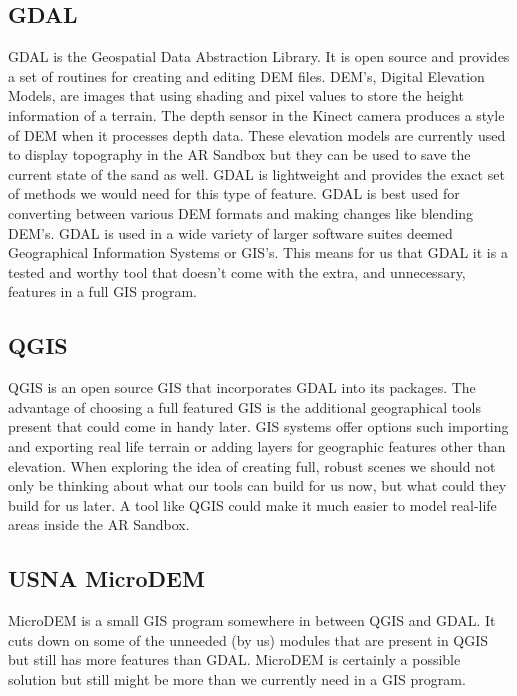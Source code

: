 \documentclass[letterpaper, 10pt, onecolumn, draftclsnofoot]{IEEEtran}
\begin{document}
    \subsection{GDAL}
    GDAL is the Geospatial Data Abstraction Library. It is open source and provides a set of routines for creating and editing DEM files. DEM’s, Digital Elevation Models, are images that using shading and pixel values to store the height information of a terrain. The depth sensor in the Kinect camera produces a style of DEM when it processes depth data. These elevation models are currently used to display topography in the AR Sandbox but they can be used to save the current state of the sand as well. GDAL is lightweight and provides the exact set of methods we would need for this type of feature. GDAL is best used for converting between various DEM formats and making changes like blending DEM’s. GDAL is used in a wide variety of larger software suites deemed Geographical Information Systems or GIS’s. This means for us that GDAL it is a tested and worthy tool that doesn’t come with the extra, and unnecessary, features in a full GIS program.
    
    \subsection{QGIS}
    QGIS is an open source GIS that incorporates GDAL into its packages. The advantage of choosing a full featured GIS is the additional geographical tools present that could come in handy later. GIS systems offer options such importing and exporting real life terrain or adding layers for geographic features other than elevation. When exploring the idea of creating full, robust scenes we should not only be thinking about what our tools can build for us now, but what could they build for us later. A tool like QGIS could make it much easier to model real-life areas inside the AR Sandbox.
    
    \subsection{USNA MicroDEM}
    MicroDEM is a small GIS program somewhere in between QGIS and GDAL. It cuts down on some of the unneeded (by us) modules that are present in QGIS but still has more features than GDAL. MicroDEM is certainly a possible solution but still might be more than we currently need in a GIS program.
    
\end{document}
